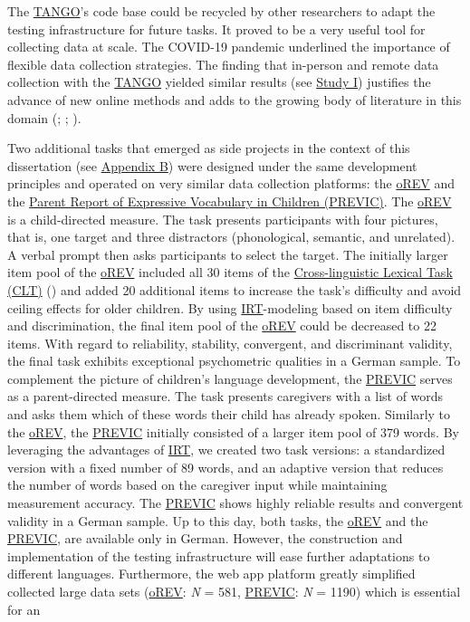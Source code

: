\documentclass[
]{scrbook}
\begin{document}
The \hyperref[acronyms_TANGO]{TANGO}'s code base could be recycled by other researchers to adapt the testing infrastructure for future tasks. It proved to be a very useful tool for collecting data at scale. The COVID-19 pandemic underlined the importance of flexible data collection strategies. The finding that in-person and remote data collection with the \hyperref[acronyms_TANGO]{TANGO} yielded similar results (see \hyperref[studyI]{Study I}) justifies the advance of new online methods and adds to the growing body of literature in this domain (; ; ).

Two additional tasks that emerged as side projects in the context of this dissertation (see \hyperref[appendixB]{Appendix B}) were designed under the same development principles and operated on very similar data collection platforms: the \hyperref[acronyms_oREV]{oREV} and the \hyperref[acronyms_PREVIC]{Parent Report of Expressive Vocabulary in Children (PREVIC)}. The \hyperref[acronyms_oREV]{oREV} is a child-directed measure. The task presents participants with four pictures, that is, one target and three distractors (phonological, semantic, and unrelated). A verbal prompt then asks participants to select the target. The initially larger item pool of the \hyperref[acronyms_oREV]{oREV} included all 30 items of the \hyperref[acronyms_CLT]{Cross-linguistic Lexical Task (CLT)} () and added 20 additional items to increase the task's difficulty and avoid ceiling effects for older children. By using \hyperref[acronyms_IRT]{IRT}-modeling based on item difficulty and discrimination, the final item pool of the \hyperref[acronyms_oREV]{oREV} could be decreased to 22 items. With regard to reliability, stability, convergent, and discriminant validity, the final task exhibits exceptional psychometric qualities in a German sample. To complement the picture of children's language development, the \hyperref[acronyms_PREVIC]{PREVIC} serves as a parent-directed measure. The task presents caregivers with a list of words and asks them which of these words their child has already spoken. Similarly to the \hyperref[acronyms_oREV]{oREV}, the \hyperref[acronyms_PREVIC]{PREVIC} initially consisted of a larger item pool of 379 words. By leveraging the advantages of \hyperref[acronyms_IRT]{IRT}, we created two task versions: a standardized version with a fixed number of 89 words, and an adaptive version that reduces the number of words based on the caregiver input while maintaining measurement accuracy. The \hyperref[acronyms_PREVIC]{PREVIC} shows highly reliable results and convergent validity in a German sample. Up to this day, both tasks, the \hyperref[acronyms_oREV]{oREV} and the \hyperref[acronyms_PREVIC]{PREVIC}, are available only in German. However, the construction and implementation of the testing infrastructure will ease further adaptations to different languages. Furthermore, the web app platform greatly simplified collected large data sets (\hyperref[acronyms_oREV]{oREV}: \emph{N} = 581, \hyperref[acronyms_PREVIC]{PREVIC}: \emph{N} = 1190) which is essential for an 
\end{document}
